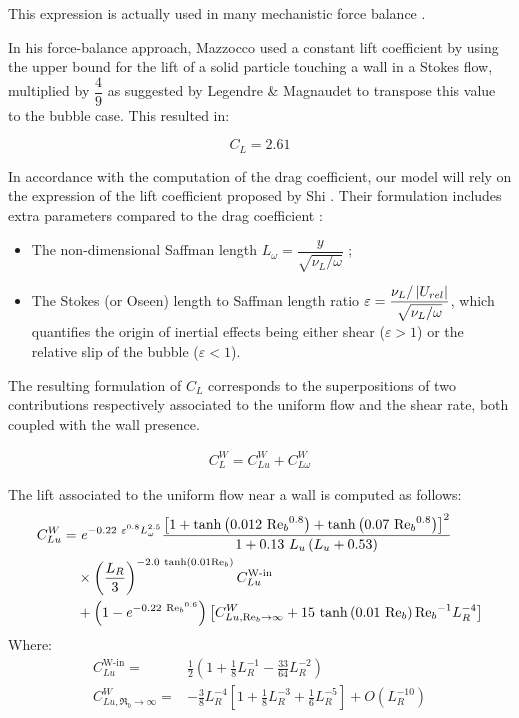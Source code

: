 This expression is actually used in many mechanistic force balance \cite{klausner_vapor_1993, chen_prediction_2012, sugrue_modified_2016, ren_development_2020}.


\npar

In his force-balance approach, Mazzocco \etal \cite{mazzocco_reassessed_2018} used a constant lift coefficient by using the upper bound for the lift of a solid particle touching a wall in a Stokes flow, multiplied by $\dfrac{4}{9}$ as suggested by Legendre \& Magnaudet \cite{legendre_lift_1998} to transpose this value to the bubble case. This resulted in:

\begin{equation}
C_{L} = 2.61
\end{equation}


\npar

In accordance with the computation of the drag coefficient, our model will rely on the expression of the lift coefficient proposed by Shi \etal \cite{shi_drag_2021}. Their formulation includes extra parameters compared to the drag coefficient :
\begin{itemize}
\item The non-dimensional Saffman length $L_{\omega} = \dfrac{y}{\sqrt{\nu_{L} / \omega}}$ ;
\item The Stokes (or Oseen) length to Saffman length ratio $\varepsilon = \dfrac{\nu_{L} / \left| U_{rel} \right|}{\sqrt{\nu_{L} / \omega}}$, which quantifies the origin of inertial effects being either shear ($\varepsilon >1$) or the relative slip of the bubble ($\varepsilon < 1$).

\end{itemize}  

The resulting formulation of $C_{L}$ corresponds to the superpositions of two contributions respectively associated to the uniform flow and the shear rate, both coupled with the wall presence. 

\begin{align}
C_{L}^{W} =C_{Lu}^{W} + C_{L\omega}^{W}
\label{eq:lift_shi}
\end{align}



The lift associated to the uniform flow near a wall is computed as follows:
\begin{align}
\nonumber C_{Lu}^{W} =&\  e^{-0.22\ \varepsilon^{0.8}L_{\omega}^{2.5}} \frac{ \crocht{1 + \tanh{0.012\ {\Re_{b}}^{0.8}} + \tanh{0.07\ {\Re_{b}}^{0.8}} }^{2} } {1+0.13\ L_{u} \parth{L_{u}+0.53} } \\
%
\nonumber			&\times  \parth{\frac{L_{R}}{3}}^{-2.0\ \tanh{0.01\Re_{b}}}  C_{Lu}^{\text{W-in}}\\
%
&+\parth{1-e^{-0.22\ {\Re_{b}}^{0.6}} } \crocht{ C_{Lu,\Re_{b}\to \infty}^{W} + 15\ \tanh{ 0.01\ \Re_{b} }{\Re_{b}}^{-1} L_{R}^{-4} }
%
\end{align}
Where:
\begin{align}
C_{Lu}^{\text{W-in}}=&\frac{1}{2}\left(1+\frac{1}{8}L_{R}^{-1}-\frac{33}{64}L_{R}^{-2}\right)\\
%
C_{Lu, \Re_{b} \to \infty}^{W} = & -\frac{3}{8}L_{R}^{-4}\left[1+\frac{1}{8}L_{R}^{-3}+\frac{1}{6}L_{R}^{-5}\right] + O\left(L_{R}^{-10}\right)
\end{align}


